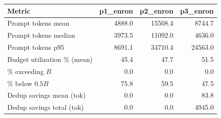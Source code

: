 \begin{tabular}{lrrr}
\toprule
Metric & p1\_enron & p2\_enron & p3\_enron \\
\midrule
Prompt tokens mean & 4888.0 & 15508.4 & 8744.7 \\
Prompt tokens median & 3973.5 & 11092.0 & 4636.0 \\
Prompt tokens p95 & 8691.1 & 34710.4 & 24563.0 \\
Budget utilization \% (mean) & 45.4 & 47.7 & 51.5 \\
\% exceeding $B$ & 0.0 & 0.0 & 0.0 \\
\% below $0.5B$ & 75.8 & 59.5 & 47.5 \\
Dedup savings mean (tok) & 0.0 & 0.0 & 83.8 \\
Dedup savings total (tok) & 0.0 & 0.0 & 4945.0 \\
\bottomrule
\end{tabular}

